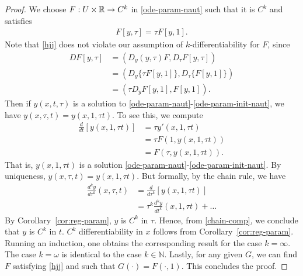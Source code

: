 \begin{proof}
  We choose $F: U \times \mathbb{R} \to C^{k}$ in \eqref{ode-param-naut}
  such that it is $C^{k}$ and satisfies 
  \begin{equation}
    \label{hjj}
  \begin{split}
    F\left[ y, \tau \right] = \tau F \left[ y, 1 \right].
  \end{split}
  \end{equation}
  Note that \eqref{hjj} does not violate our assumption of $k$-differentiability
  for $F$, since
%
%
\begin{equation*}
\begin{split}
  DF\left[ y, \tau \right]
  & = \left( D_{y}(y, \tau) F, D_{\tau} F[y, \tau] \right)
  \\
  & = (  D_{y} \{\tau F[y, 1] \}, D_{\tau} \{F[y, 1] \} ) 
  \\
  & = ( \tau D_{y} F[y, 1], F[y, 1]).
\end{split}
\end{equation*}
%
%
Then if $y(x, t, \tau)$ is a solution to
\eqref{ode-param-naut}-\eqref{ode-param-init-naut}, we have $y(x, \tau, t ) =
y(x, 1, \tau t)$. To see this, we compute
%
%
\begin{equation*}
\begin{split}
\frac{d}{dt}\left[ y(x, 1, \tau t) \right]
& = \tau y'(x, 1, \tau t)
\\
& = \tau F\left( 1, y(x, 1, \tau t) \right)
\\
& = F(\tau, y(x, 1, \tau t)).
\end{split}
\end{equation*}
%
%
That is, $y(x, 1, \tau t)$ is a solution
\eqref{ode-param-naut}-\eqref{ode-param-init-naut}. By uniqueness, $y(x, \tau, t) =
y(x, 1, \tau t)$. But formally, by the chain rule, we have
%
%
\begin{equation}
  \label{chain-comp}
\begin{split}
\frac{d^{k}y}{d \tau^{k}}(x, \tau, t) 
& = \frac{d}{d \tau^{k}}\left[ y(x, 1, \tau t) \right]
\\
& = \tau^{k} \frac{d^{k}y}{dt^{k}}(x, 1, \tau t) + \dots
\end{split}
\end{equation}
%
%
By Corollary~\ref{cor:reg-param}, $y$ is $C^{k}$ in $\tau$. Hence, from
\eqref{chain-comp}, we conclude that $y$ is $C^{k}$ in $t$. $C^{k}$
differentiability in $x$ follows from Corollary~\ref{cor:reg-param}.
Running an induction, one obtains the corresponding result
for the case $k = \infty$. The case $k = \omega$ is identical to the case
$k \in \mathbb{N}$. Lastly, for any given $G$,
we can find $F$ satisfying \eqref{hjj} and such that
$G(\cdot) = F(\cdot, 1)$. This concludes the proof.
%
\end{proof}
%
